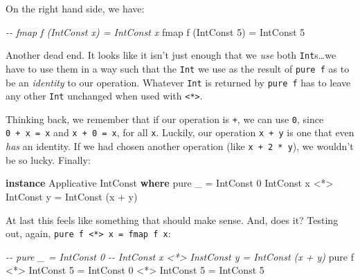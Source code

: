 \documentclass[]{article}
\newenvironment{Shaded}{}{}
\newcommand{\CommentTok}[1]{\textcolor[rgb]{0.38,0.63,0.69}{\textit{#1}}}
\newcommand{\DataTypeTok}[1]{\textcolor[rgb]{0.56,0.13,0.00}{#1}}
\newcommand{\DecValTok}[1]{\textcolor[rgb]{0.25,0.63,0.44}{#1}}
\newcommand{\FunctionTok}[1]{\textcolor[rgb]{0.02,0.16,0.49}{#1}}
\newcommand{\KeywordTok}[1]{\textcolor[rgb]{0.00,0.44,0.13}{\textbf{#1}}}
\newcommand{\NormalTok}[1]{#1}
\newcommand{\OperatorTok}[1]{\textcolor[rgb]{0.40,0.40,0.40}{#1}}
\newcommand{\OtherTok}[1]{\textcolor[rgb]{0.00,0.44,0.13}{#1}}
\begin{document}
On the right hand side, we have:

\begin{Shaded}
\begin{Highlighting}[]
\CommentTok{{-}{-} fmap f (IntConst x) = IntConst x}
\FunctionTok{fmap}\NormalTok{ f (}\DataTypeTok{IntConst} \DecValTok{5}\NormalTok{) }\OtherTok{=} \DataTypeTok{IntConst} \DecValTok{5}
\end{Highlighting}
\end{Shaded}

Another dead end. It looks like it isn't just enough that we \emph{use} both
\texttt{Int}s\ldots we have to use them in a way such that the \texttt{Int} we
use as the result of \texttt{pure\ f} as to be an \emph{identity} to our
operation. Whatever \texttt{Int} is returned by \texttt{pure\ f} has to leave
any other \texttt{Int} unchanged when used with
\texttt{\textless{}*\textgreater{}}.

Thinking back, we remember that if our operation is \texttt{+}, we can use
\texttt{0}, since \texttt{0\ +\ x\ =\ x} and \texttt{x\ +\ 0\ =\ x}, for all
\texttt{x}. Luckily, our operation \texttt{x\ +\ y} is one that even \emph{has}
an identity. If we had chosen another operation (like \texttt{x\ +\ 2\ *\ y}),
we wouldn't be so lucky. Finally:

\begin{Shaded}
\begin{Highlighting}[]
\KeywordTok{instance} \DataTypeTok{Applicative} \DataTypeTok{IntConst} \KeywordTok{where}
    \FunctionTok{pure}\NormalTok{ \_                    }\OtherTok{=} \DataTypeTok{IntConst} \DecValTok{0}
    \DataTypeTok{IntConst}\NormalTok{ x }\OperatorTok{\textless{}*\textgreater{}} \DataTypeTok{IntConst}\NormalTok{ y }\OtherTok{=} \DataTypeTok{IntConst}\NormalTok{ (x }\OperatorTok{+}\NormalTok{ y)}
\end{Highlighting}
\end{Shaded}

At last this feels like something that should make sense. And, does it? Testing
out, again, \texttt{pure\ f\ \textless{}*\textgreater{}\ x\ =\ fmap\ f\ x}:

\begin{Shaded}
\begin{Highlighting}[]
\CommentTok{{-}{-} pure \_                     = IntConst 0}
\CommentTok{{-}{-} IntConst x \textless{}*\textgreater{} InstConst y = IntConst (x + y)}
\FunctionTok{pure}\NormalTok{ f }\OperatorTok{\textless{}*\textgreater{}} \DataTypeTok{IntConst} \DecValTok{5} \OtherTok{=} \DataTypeTok{IntConst} \DecValTok{0} \OperatorTok{\textless{}*\textgreater{}} \DataTypeTok{IntConst} \DecValTok{5}
                      \OtherTok{=} \DataTypeTok{IntConst} \DecValTok{5}
\end{Highlighting}
\end{Shaded}
\end{document}

